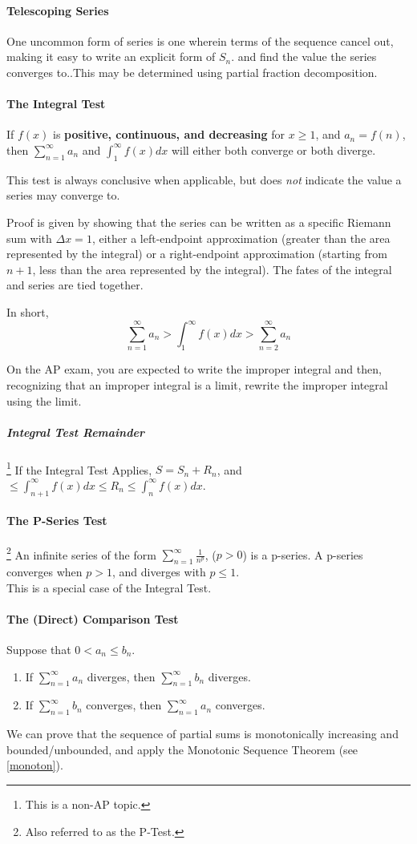 \documentclass{article}
\begin{document}
\paragraph{Telescoping Series} One uncommon form of series is one wherein terms of the sequence cancel out, making it easy to write an explicit form of $S_n$. and find the value the series converges to..This may be determined using partial fraction decomposition.

\paragraph{The Integral Test} If $f(x)$ is \textbf{positive, continuous, and decreasing} for $x\ge1$, and $a_n = f(n)$, then $\sum_{n=1}^{\infty} a_n$ and $\int_{1}^{\infty} f(x) dx$ will either both converge or both diverge.

This test is always conclusive when applicable, but does \emph{not} indicate the value a series may converge to.

Proof is given by showing that the series can be written as a specific Riemann sum with $\Delta x = 1$, either a left-endpoint approximation (greater than the area represented by the integral) or a right-endpoint approximation (starting from $n+1$, less than the area represented by the integral). The fates of the integral and series are tied together.

In short,
$$\sum_{n=1}^{\infty} a_n > \int_{1}^{\infty} f(x)dx > \sum_{n=2}^{\infty} a_n$$

On the AP exam, you are expected to write the improper integral and then, recognizing that an improper integral is a limit, rewrite the improper integral using the limit.

\subparagraph{Integral Test Remainder}\footnote{This is a non-AP topic.} If the Integral Test Applies, $S=S_n+R_n$, and $\le \int_{n+1}^{\infty} f(x)dx \le R_n \le \int_{n}^{\infty} f(x)dx$.

\paragraph{The P-Series Test}\footnote{Also referred to as the P-Test.} An infinite series of the form $\sum_{n=1}^{\infty} \frac{1}{n^p}$, ($p>0$) is a p-series. A p-series converges when $p > 1$, and diverges with $p \le 1$.\\
This is a special case of the Integral Test.

\paragraph{The (Direct) Comparison Test}
Suppose that $0 < a_n \le b_n$.
\begin{enumerate}
    \item If $\sum_{n=1}^{\infty} a_n$ diverges, then $\sum_{n=1}^{\infty} b_n$ diverges.
    \item If $\sum_{n=1}^{\infty} b_n$ converges, then $\sum_{n=1}^{\infty} a_n$ converges.
\end{enumerate}
We can prove that the sequence of partial sums is monotonically increasing and bounded/unbounded, and apply the Monotonic Sequence Theorem (see \ref{monoton}).
\end{document}
